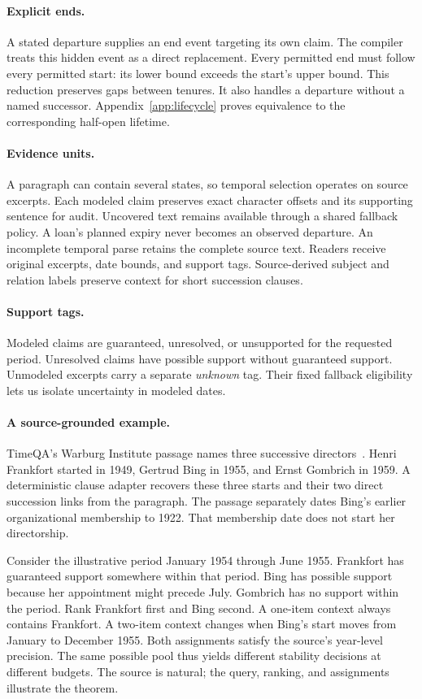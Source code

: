\paragraph{Explicit ends.}
A stated departure supplies an end event targeting its own claim.
The compiler treats this hidden event as a direct replacement.
Every permitted end must follow every permitted start: its lower bound exceeds the start's upper bound.
This reduction preserves gaps between tenures.
It also handles a departure without a named successor.
Appendix~\ref{app:lifecycle} proves equivalence to the corresponding half-open lifetime.

\paragraph{Evidence units.}
A paragraph can contain several states, so temporal selection operates on source excerpts.
Each modeled claim preserves exact character offsets and its supporting sentence for audit.
Uncovered text remains available through a shared fallback policy.
A loan's planned expiry never becomes an observed departure.
An incomplete temporal parse retains the complete source text.
Readers receive original excerpts, date bounds, and support tags.
Source-derived subject and relation labels preserve context for short succession clauses.

\paragraph{Support tags.}
Modeled claims are guaranteed, unresolved, or unsupported for the requested period.
Unresolved claims have possible support without guaranteed support.
Unmodeled excerpts carry a separate \emph{unknown} tag.
Their fixed fallback eligibility lets us isolate uncertainty in modeled dates.

\paragraph{A source-grounded example.}

TimeQA's Warburg Institute passage names three successive directors~\citep{chen2021timeqa}.
Henri Frankfort started in 1949, Gertrud Bing in 1955, and Ernst Gombrich in 1959.
A deterministic clause adapter recovers these three starts and their two direct succession links from the paragraph.
The passage separately dates Bing's earlier organizational membership to 1922.
That membership date does not start her directorship.

Consider the illustrative period January 1954 through June 1955.
Frankfort has guaranteed support somewhere within that period.
Bing has possible support because her appointment might precede July.
Gombrich has no support within the period.
Rank Frankfort first and Bing second.
A one-item context always contains Frankfort.
A two-item context changes when Bing's start moves from January to December 1955.
Both assignments satisfy the source's year-level precision.
The same possible pool thus yields different stability decisions at different budgets.
The source is natural; the query, ranking, and assignments illustrate the theorem.
